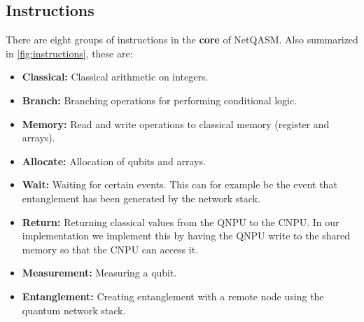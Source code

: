 \subsection{Instructions}
\label{sec:instructions}
There are eight groups of instructions in the \textbf{core} of \ac{NetQASM}.
Also summarized in \cref{fig:instructions}, these are:
\begin{itemize}
      \item \textbf{Classical:} Classical arithmetic on integers.
      \item \textbf{Branch:} Branching operations for performing conditional logic.
      \item \textbf{Memory:} Read and write operations to classical memory (register and arrays).
      \item \textbf{Allocate:} Allocation of qubits and arrays.
      \item \textbf{Wait:} Waiting for certain events. This can for example be the event that entanglement has been generated by the network stack.
      \item \textbf{Return:} Returning classical values from the \ac{QNPU} to the \ac{CNPU}.
            In our implementation we implement this by having the \ac{QNPU} write to the shared memory so that the \ac{CNPU} can access it.
      \item \textbf{Measurement:} Measuring a qubit.
      \item \textbf{Entanglement:} Creating entanglement with a remote node using the quantum network stack.
\end{itemize}

